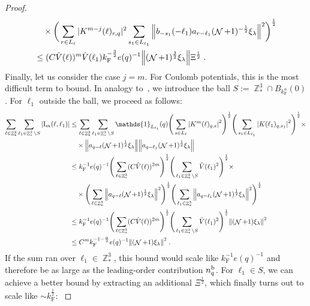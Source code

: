 \documentclass[12pt,a4paper]{article}
\numberwithin{equation}{section}
\newcommand{\1}{\mathbb{I}}
\renewcommand{\b}{\textnormal{b}}
\newcommand{\F}{\mathrm{F}}
\newcommand{\I}{\mathrm{I}}
\DeclareMathOperator{\Z}{\mathbb{Z}}
\DeclareMathOperator{\NN}{\mathcal{N}}
\newcommand{\half}{\frac{1}{2}}
\theoremstyle{plain}
\theoremstyle{definition}
\theoremstyle{remark}
\theoremstyle{plain}
\theoremstyle{definition}
\theoremstyle{remark}
\begin{document}
\begin{proof}
\begin{align}
		&\quad \times 
	\bigg(\sum\limits_{r\in L_{\ell}} |K^{m-j}(\ell)_{r,q} |^2
		\sum\limits_{s_1 \in L_{\ell_1}}\norm{ b_{-s_1}(-\ell_1) a_{r-\ell_1} (\NN+1)^{-\half}\xi_\lambda }^2\bigg)^\half
	\nonumber\\
	&\leq (C \hat{V}(\ell))^m
		\hat{V}(\ell_1)
		k_{\F}^{-\frac 32} e(q)^{-1}
		\norm{ (\NN+1)^{\frac 32}\xi_\lambda } \Xi^{\half} \;. \label{eq:estEQ2112}
\end{align}
\textcolor{green!30!black}{Finally, let us consider the case $ j = m $. For Coulomb potentials, this is the most difficult term to bound. In analogy to~\cite{CHN24}, we introduce the ball $ S := \Z^3_* \cap B_{k_{\F}^{\alpha}}(0) $. For $ \ell_1 $ outside the ball, we proceed as follows:
\begin{align}
	\sum_{\ell \in \Z^3_*} \sum_{\ell_1 \in \Z^3_* \setminus S} |\I_m(\ell, \ell_1)|
	&\leq \sum_{\ell \in \Z^3_*} \sum_{\ell_1 \in \Z^3_* \setminus S} \mathds{1}_{L_{\ell_1}}(q) \Bigg(\sum\limits_{s \in L_{\ell}} \abs{K^m(\ell)_{q,s}}^2\Bigg)^\half
		\Bigg(\sum\limits_{s_1 \in L_{\ell_1}} \abs{K(\ell_1)_{q,s_1}}^2\Bigg)^\half \times \nonumber \\
	& \quad \times \norm{ a_{q-\ell} (\NN+1)^{\half} \xi_\lambda}
		\norm{ a_{q-\ell_1} (\NN+1)^{\half} \xi_\lambda }\nonumber\\
	&\leq k_{\F}^{-1} e(q)^{-1}
		\Bigg( \sum_{\ell \in \Z^3_*} (C \hat{V}(\ell))^{2m} \Bigg)^{\half}
		\Bigg( \sum_{\ell_1 \in \Z^3_* \setminus S} \hat{V}(\ell_1)^2 \Bigg)^{\half} \times \nonumber \\
	& \quad \times 
		\Bigg( \sum_{\ell \in \Z^3_*} \norm{ a_{q-\ell} (\NN+1)^{\half} \xi_\lambda}^2 \Bigg)^{\half}
		\Bigg( \sum_{\ell_1 \in \Z^3_*} \norm{ a_{q-\ell_1} (\NN+1)^{\half} \xi_\lambda }^2 \Bigg)^{\half} \nonumber\\
	&\leq k_{\F}^{-1} e(q)^{-1}
		\Bigg( \sum_{\ell \in \Z^3_*} (C \hat{V}(\ell))^{2m} \Bigg)^{\half}
		\Bigg( \sum_{\ell_1 \in \Z^3_* \setminus S} \hat{V}(\ell_1)^2 \Bigg)^{\half} \norm{(\NN+1) \xi_\lambda}^2 \nonumber\\
	&\leq C^m k_{\F}^{-1-\frac{\alpha}{2}} e(q)^{-1}
		\norm{(\NN+1) \xi_\lambda}^2 \;. \label{eq:estEQ2113_Coulomb_1}
\end{align}
If the sum ran over $ \ell_1 \in \Z^3_* $, this bound would scale like $ k_{\F}^{-1} e(q)^{-1} $ and therefore be as large as the leading-order contribution $ n_q^{\b} $. For $ \ell_1 \in S $, we can achieve a better bound by extracting an additional $ \Xi^{\half} $, which finally turns out to scale like $ \sim k_{\F}^{\half} $:
}
\end{proof}
\end{document}
